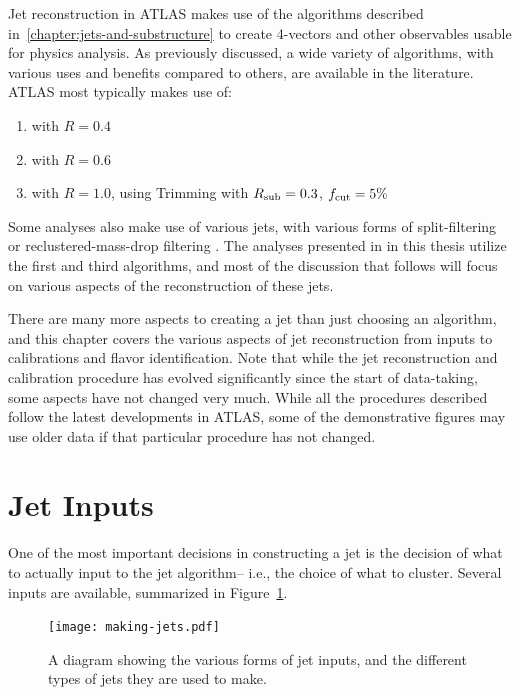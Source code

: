 \label{chapter:jet-reconstruction}


Jet reconstruction in ATLAS makes use of the algorithms described in~\ref{chapter:jets-and-substructure} to create 4-vectors and other observables usable for physics analysis. As previously discussed, a wide variety of algorithms, with various uses and benefits compared to others, are available in the literature. ATLAS most typically makes use of:

\begin{enumerate}
	\item \antikt with $R = 0.4$
	\item \antikt with $R = 0.6$
	\item \antikt with $R = 1.0$, using Trimming with $R_{\rm sub} = 0.3$, $f_{\rm cut} = 5\%$
\end{enumerate}
%
Some analyses also make use of various \CAFat jets, with various forms of split-filtering or reclustered-mass-drop filtering . The analyses presented in in this thesis utilize the first and third algorithms, and most of the discussion that follows will focus on various aspects of the reconstruction of these jets.

There are many more aspects to creating a jet than just choosing an algorithm, and this chapter covers the various aspects of jet reconstruction from inputs to calibrations and flavor identification. Note that while the jet reconstruction and calibration procedure has evolved significantly since the start of data-taking, some aspects have not changed very much. While all the procedures described follow the latest developments in ATLAS, some of the demonstrative figures may use older data if that particular procedure has not changed.

\section{Jet Inputs}


One of the most important decisions in constructing a jet is the decision of what to actually input to the jet algorithm-- i.e., the choice of what to cluster. Several inputs are available, summarized in Figure~\ref{fig:jet-reconstruction:making-jets}. 


\begin{figure}
\centering
\texttt{[image: making-jets.pdf]}
\label{fig:jet-reconstruction:making-jets}
\caption{A diagram showing the various forms of jet inputs, and the different types of jets they are used to make.}
\end{figure}

